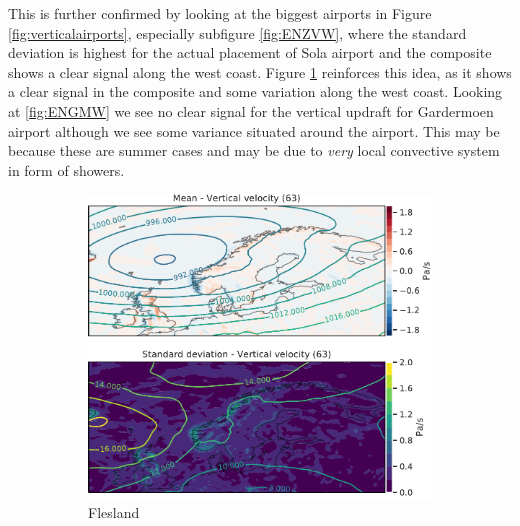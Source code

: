 This is further confirmed by looking at the biggest airports in Figure \ref{fig:verticalairports}, especially subfigure \ref{fig:ENZVW}, where the standard deviation is highest for the actual placement of Sola airport and the composite shows a clear signal along the west coast. Figure \ref{fig:ENBRW} reinforces this idea, as it shows a clear signal in the composite and some variation along the west coast. Looking at \ref{fig:ENGMW} we see no clear signal for the vertical updraft for Gardermoen airport although we see some variance situated around the airport. This may be because these are summer cases and may be due to \textit{very} local convective system in form of showers.

\begin{figure}
     \centering
     \begin{subfigure}[b]{0.49\textwidth}
         \centering
         \includegraphics[width=\textwidth]{Figures/WENBR.pdf}
         \caption{Flesland}
         \label{fig:ENBRW}
     \end{subfigure}
     \hfill
     \begin{subfigure}[b]{0.49\textwidth}
         \centering

\end{subfigure}
\end{figure}
